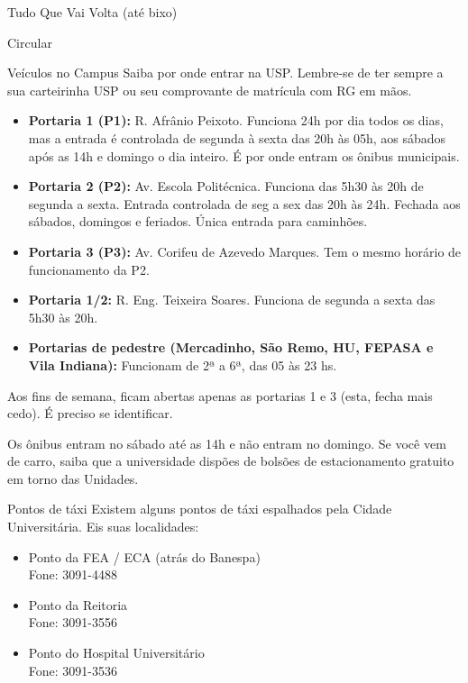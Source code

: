\begin{secao}{Tudo Que Vai Volta (até bixo)}
\begin{subsecao}{Circular}
\begin{itemize}
\end{itemize}
\end{subsecao}

\begin{subsecao}{Veículos no Campus}
Saiba por onde entrar na USP. Lembre-se de ter sempre a sua carteirinha USP ou
seu comprovante de matrícula com RG em mãos. 
\begin{itemize}
  \item {\bf Portaria 1 (P1):} R. Afrânio Peixoto. Funciona 24h por dia todos os
    dias, mas a entrada é controlada de segunda à sexta das 20h às 05h, aos sábados
    após as 14h e domingo o dia inteiro. É por onde entram os ônibus municipais. 
    
  \item {\bf Portaria 2 (P2):} Av. Escola Politécnica. Funciona das 5h30 às 20h
    de segunda a sexta. Entrada controlada de seg a sex das 20h às 24h. Fechada
    aos sábados, domingos e feriados. Única entrada para caminhões. 
    
  \item {\bf Portaria 3 (P3):} Av. Corifeu de Azevedo Marques. Tem o mesmo horário
    de funcionamento da P2.

  \item {\bf Portaria 1/2:} R. Eng. Teixeira Soares. Funciona de segunda a sexta das 5h30 às 20h. 
    
  \item {\bf Portarias de pedestre (Mercadinho, São Remo, HU, FEPASA e
      Vila Indiana):} Funcionam de 2ª a 6ª, das 05 às 23 hs.

\end{itemize}

Aos fins de semana, ficam abertas apenas as portarias 1 e 3 (esta, fecha mais cedo). É preciso se identificar.

Os ônibus entram no sábado até as 14h e não entram no domingo. Se você vem de carro, saiba que a universidade dispões de bolsões de estacionamento
gratuito em torno das Unidades.

\end{subsecao}

\begin{subsecao}{Pontos de táxi}
Existem alguns pontos de táxi espalhados pela Cidade Universitária. Eis suas
localidades:

\begin{itemize}
\item Ponto da FEA / ECA (atrás do Banespa)\\
Fone: 3091-4488

\item Ponto da Reitoria\\
Fone: 3091-3556

\item Ponto do Hospital Universitário\\
Fone: 3091-3536
\end{itemize}
\end{subsecao}


\end{secao}

